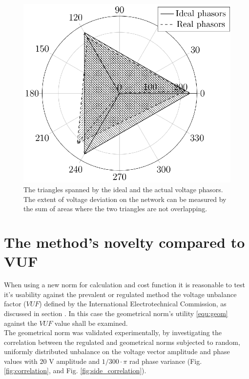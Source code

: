             \begin{figure}[!ht]
           \centering
           \includegraphics[scale=0.95]{Unblance_EPS_Pics/UnbalRedComp_JCP-figure1.eps}
           \caption{The triangles spanned by the ideal and the actual voltage phasors. The extent of voltage deviation on the network can be measured by the sum of areas where the two triangles are not overlapping.}
           \label{fig:threephase}
            \end{figure}

\section{The method's novelty compared to VUF}\label{VUB:sec:AdditionalContent}

When using a new norm for calculation and cost function it is reasonable to test it's usability against the prevalent or regulated method the voltage unbalance factor ($VUF$) defined by the International Electrotechnical Commission, as discussed in section . In this case the geometrical norm's utility \ref{equ:geom} against the $VUF$ value shall be examined. \\
The geometrical norm was validated experimentally, by investigating the correlation between the regulated  and geometrical norms subjected to random, uniformly distributed unbalance on the voltage vector amplitude and phase values with $20$ V amplitude and $1/300\cdot\pi$ rad phase variance (Fig. \ref{fig:correlation}, and Fig. \ref{fig:side_correlation}).


